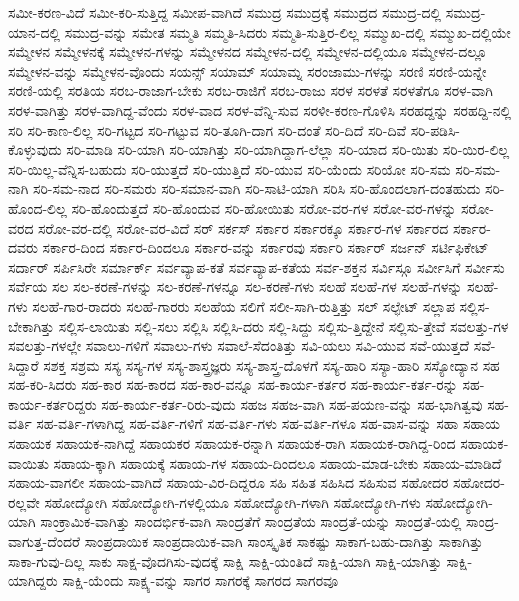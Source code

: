 {ಸಮೀ-ಕರಣ-ವಿದೆ
ಸಮೀ-ಕರಿ-ಸುತ್ತಿದ್ದ
ಸಮೀಪ-ವಾಗಿದೆ
ಸಮುದ್ರ
ಸಮುದ್ರಕ್ಕೆ
ಸಮುದ್ರದ
ಸಮುದ್ರ-ದಲ್ಲಿ
ಸಮುದ್ರ-ಯಾನ-ದಲ್ಲಿ
ಸಮುದ್ರ-ವನ್ನು
ಸಮೇತ
ಸಮ್ಮತಿ
ಸಮ್ಮತಿ-ಸಿದರು
ಸಮ್ಮತಿ-ಸುತ್ತಿರ-ಲಿಲ್ಲ
ಸಮ್ಮುಖ-ದಲ್ಲಿ
ಸಮ್ಮುಖ-ದಲ್ಲಿಯೇ
ಸಮ್ಮೇಳನ
ಸಮ್ಮೇಳನಕ್ಕೆ
ಸಮ್ಮೇಳನ-ಗಳನ್ನು
ಸಮ್ಮೇಳನದ
ಸಮ್ಮೇಳನ-ದಲ್ಲಿ
ಸಮ್ಮೇಳನ-ದಲ್ಲಿಯೂ
ಸಮ್ಮೇಳನ-ದಲ್ಲೂ
ಸಮ್ಮೇಳನ-ವನ್ನು
ಸಮ್ಮೇಳನ-ವೊಂದು
ಸಯನ್ಸ್
ಸಯಾಮ್
ಸಯಾಮ್ನ
ಸರಂಜಾಮು-ಗಳನ್ನು
ಸರಣಿ
ಸರಣಿ-ಯನ್ನೇ
ಸರಣಿ-ಯಲ್ಲಿ
ಸರತಿಯ
ಸರಬ-ರಾಜಾಗ-ಬೇಕು
ಸರಬ-ರಾಜಿಗೆ
ಸರಬ-ರಾಜು
ಸರಳ
ಸರಳತೆ
ಸರಳತೆಗೂ
ಸರಳ-ವಾಗಿ
ಸರಳ-ವಾಗಿತ್ತು
ಸರಳ-ವಾಗಿದ್ದ-ವೆಂದು
ಸರಳ-ವಾದ
ಸರಳ-ವೆನ್ನಿ-ಸುವ
ಸರಳೀ-ಕರಣ-ಗೊಳಿಸಿ
ಸರಹದ್ದನ್ನು
ಸರಹದ್ದಿ-ನಲ್ಲಿ
ಸರಿ
ಸರಿ-ಕಾಣ-ಲಿಲ್ಲ
ಸರಿ-ಗಟ್ಟದ
ಸರಿ-ಗಟ್ಟುವ
ಸರಿ-ತೂಗಿ-ದಾಗ
ಸರಿ-ದಂತೆ
ಸರಿ-ದಿದೆ
ಸರಿ-ದಿವೆ
ಸರಿ-ಪಡಿಸಿ-ಕೊಳ್ಳುವುದು
ಸರಿ-ಮಾಡಿ
ಸರಿ-ಯಾಗಿ
ಸರಿ-ಯಾಗಿತ್ತು
ಸರಿ-ಯಾಗಿದ್ದಾಗ-ಲೆಲ್ಲಾ
ಸರಿ-ಯಾದ
ಸರಿ-ಯಿತು
ಸರಿ-ಯಿರ-ಲಿಲ್ಲ
ಸರಿ-ಯಿಲ್ಲ-ವೆನ್ನಿಸ-ಬಹುದು
ಸರಿ-ಯುತ್ತದೆ
ಸರಿ-ಯುತ್ತಿದೆ
ಸರಿ-ಯುವ
ಸರಿ-ಯೆಂದು
ಸರಿಯೋ
ಸರಿ-ಸಮ
ಸರಿ-ಸಮ-ನಾಗಿ
ಸರಿ-ಸಮ-ನಾದ
ಸರಿ-ಸಮರು
ಸರಿ-ಸಮಾನ-ವಾಗಿ
ಸರಿ-ಸಾಟಿ-ಯಾಗಿ
ಸರಿಸಿ
ಸರಿ-ಹೊಂದಲಾಗ-ದಂತಹುದು
ಸರಿ-ಹೊಂದ-ಲಿಲ್ಲ
ಸರಿ-ಹೊಂದುತ್ತದೆ
ಸರಿ-ಹೊಂದುವ
ಸರಿ-ಹೋಯಿತು
ಸರೋ-ವರ-ಗಳ
ಸರೋ-ವರ-ಗಳನ್ನು
ಸರೋ-ವರದ
ಸರೋ-ವರ-ದಲ್ಲಿ
ಸರೋ-ವರ-ವಿದೆ
ಸರ್
ಸರ್ಕಸ್
ಸರ್ಕಾರ
ಸರ್ಕಾರಕ್ಕೂ
ಸರ್ಕಾರ-ಗಳ
ಸರ್ಕಾರದ
ಸರ್ಕಾರ-ದವರು
ಸರ್ಕಾರ-ದಿಂದ
ಸರ್ಕಾರ-ದಿಂದಲೂ
ಸರ್ಕಾರ-ವನ್ನು
ಸರ್ಕಾರವು
ಸರ್ಕಾರಿ
ಸರ್ಕಾರ್
ಸರ್ಜನ್
ಸರ್ಟಿಫಿಕೇಟ್
ಸರ್ದಾರ್
ಸರ್ಪಿಸಿರೇ
ಸರ್ಮಾರ್ಕ್
ಸರ್ವವ್ಯಾಪ-ಕತೆ
ಸರ್ವವ್ಯಾಪ-ಕತೆಯ
ಸರ್ವ-ಶಕ್ತನ
ಸರ್ವಿಸ್ಗೂ
ಸರ್ವೀಸಿಗೆ
ಸರ್ವೀಸು
ಸರ್ವೆಯ
ಸಲ
ಸಲ-ಕರಣೆ-ಗಳನ್ನು
ಸಲ-ಕರಣೆ-ಗಳನ್ನೂ
ಸಲ-ಕರಣೆ-ಗಳು
ಸಲಹೆ
ಸಲಹೆ-ಗಳ
ಸಲಹೆ-ಗಳನ್ನು
ಸಲಹೆ-ಗಳು
ಸಲಹೆ-ಗಾರ-ರಾದರು
ಸಲಹೆ-ಗಾರರು
ಸಲಹೆಯ
ಸಲಿಗೆ
ಸಲೀ-ಸಾಗಿ-ರುತ್ತಿತ್ತು
ಸಲ್
ಸಲ್ಫೇಟ್
ಸಲ್ಲಾಪ
ಸಲ್ಲಿಸ-ಬೇಕಾಗಿತ್ತು
ಸಲ್ಲಿಸ-ಲಾಯಿತು
ಸಲ್ಲಿ-ಸಲು
ಸಲ್ಲಿಸಿ
ಸಲ್ಲಿಸಿ-ದರು
ಸಲ್ಲಿ-ಸಿದ್ದು
ಸಲ್ಲಿಸು-ತ್ತಿದ್ದೇನೆ
ಸಲ್ಲಿಸು-ತ್ತೇವೆ
ಸವಲತ್ತು-ಗಳ
ಸವಲತ್ತು-ಗಳಲ್ಲೇ
ಸವಾಲು-ಗಳಿಗೆ
ಸವಾಲು-ಗಳು
ಸವಾಲೆ-ಸೆದಂತಿತ್ತು
ಸವಿ-ಯಲು
ಸವಿ-ಯುವ
ಸವೆ-ಯುತ್ತದೆ
ಸವೆ-ಸಿದ್ದಾರೆ
ಸಶಕ್ತ
ಸಶ್ರಮ
ಸಸ್ಯ
ಸಸ್ಯ-ಗಳ
ಸಸ್ಯ-ಶಾಸ್ತ್ರಜ್ಞರು
ಸಸ್ಯ-ಶಾಸ್ತ್ರ-ದೊಳಗೆ
ಸಸ್ಯ-ಹಾರಿ
ಸಸ್ಯಾ-ಹಾರಿ
ಸಸ್ಯೋದ್ಯಾನ
ಸಹ
ಸಹ-ಕರಿ-ಸಿದರು
ಸಹ-ಕಾರ
ಸಹ-ಕಾರದ
ಸಹ-ಕಾರ-ವನ್ನೂ
ಸಹ-ಕಾರ್ಯ-ಕರ್ತರ
ಸಹ-ಕಾರ್ಯ-ಕರ್ತ-ರನ್ನು
ಸಹ-ಕಾರ್ಯ-ಕರ್ತರಿದ್ದರು
ಸಹ-ಕಾರ್ಯ-ಕರ್ತ-ರಿರು-ವುದು
ಸಹಜ
ಸಹಜ-ವಾಗಿ
ಸಹ-ಪಯಣ-ವನ್ನು
ಸಹ-ಭಾಗಿತ್ವವು
ಸಹ-ವರ್ತಿ
ಸಹ-ವರ್ತಿ-ಗಳಾಗಿದ್ದ
ಸಹ-ವರ್ತಿ-ಗಳಿಗೆ
ಸಹ-ವರ್ತಿ-ಗಳು
ಸಹ-ವರ್ತಿ-ಗಳೂ
ಸಹ-ವಾಸ-ವನ್ನು
ಸಹಾ
ಸಹಾಯ
ಸಹಾಯಕ
ಸಹಾಯಕ-ನಾಗಿದ್ದೆ
ಸಹಾಯಕರ
ಸಹಾಯಕ-ರನ್ನಾಗಿ
ಸಹಾಯಕ-ರಾಗಿ
ಸಹಾಯಕ-ರಾಗಿದ್ದ-ರಿಂದ
ಸಹಾಯಕ-ವಾಯಿತು
ಸಹಾಯ-ಕ್ಕಾಗಿ
ಸಹಾಯಕ್ಕೆ
ಸಹಾಯ-ಗಳ
ಸಹಾಯ-ದಿಂದಲೂ
ಸಹಾಯ-ಮಾಡ-ಬೇಕು
ಸಹಾಯ-ಮಾಡಿದೆ
ಸಹಾಯ-ವಾಗಲೀ
ಸಹಾಯ-ವಾಗಿದೆ
ಸಹಾಯ-ವಿರ-ದಿದ್ದರೂ
ಸಹಿ
ಸಹಿತ
ಸಹಿಸಿದ
ಸಹಿಸುವ
ಸಹೋದರ
ಸಹೋದರ-ರಲ್ಲವೇ
ಸಹೋದ್ಯೋಗಿ
ಸಹೋದ್ಯೋಗಿ-ಗಳಲ್ಲಿಯೂ
ಸಹೋದ್ಯೋಗಿ-ಗಳಾಗಿ
ಸಹೋದ್ಯೋಗಿ-ಗಳು
ಸಹೋದ್ಯೋಗಿ-ಯಾಗಿ
ಸಾಂಕ್ರಾಮಿಕ-ವಾಗಿತ್ತು
ಸಾಂದರ್ಭಿಕ-ವಾಗಿ
ಸಾಂದ್ರತೆಗೆ
ಸಾಂದ್ರತೆಯ
ಸಾಂದ್ರತೆ-ಯನ್ನು
ಸಾಂದ್ರತೆ-ಯಲ್ಲಿ
ಸಾಂದ್ರ-ವಾಗುತ್ತ-ದೆಂದರೆ
ಸಾಂಪ್ರದಾಯಿಕ
ಸಾಂಪ್ರದಾಯಿಕ-ವಾಗಿ
ಸಾಂಸ್ಕೃತಿಕ
ಸಾಕಷ್ಟು
ಸಾಕಾಗ-ಬಹು-ದಾಗಿತ್ತು
ಸಾಕಾಗಿತ್ತು
ಸಾಕಾ-ಗುವು-ದಿಲ್ಲ
ಸಾಕು
ಸಾಕ್ಷ-ವೊದಗಿಸು-ವುದಕ್ಕೆ
ಸಾಕ್ಷಿ
ಸಾಕ್ಷಿ-ಯಂತಿದೆ
ಸಾಕ್ಷಿ-ಯಾಗಿ
ಸಾಕ್ಷಿ-ಯಾಗಿತ್ತು
ಸಾಕ್ಷಿ-ಯಾಗಿದ್ದರು
ಸಾಕ್ಷಿ-ಯೆಂದು
ಸಾಕ್ಷ್ಯ-ವನ್ನು
ಸಾಗರ
ಸಾಗರಕ್ಕೆ
ಸಾಗರದ
ಸಾಗರವೂ
}

